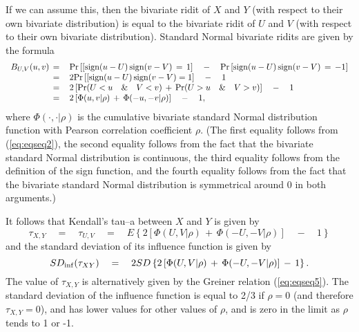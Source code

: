 \documentclass[a4paper]{article}      %
\begin{document}
If we can assume this, then the bivariate ridit of $X$ and $Y$ (with respect to their own bivariate distribution)
is equal to the bivariate ridit of $U$ and $V$ (with respect to their own bivariate distribution).
Standard Normal bivariate ridits are given by the formula
\begin{equation}
\begin{array}{rl}
B_{U,V}(u,v) \, = \,& {\rm Pr}\left[[{\rm sign}(u-U) \, {\rm sign}(v-V) \, = \, 1\right] \quad - \quad {\rm Pr}\left[{\rm sign}(u-U) \, {\rm sign}(v-V) \, = \, -1\right] \\
 = \,& 2{\rm Pr}\left[[{\rm sign}(u-U) \, {\rm sign}(v-V)=1\right] \quad - \quad 1 \\
 = \,& 2 \left[ {\rm Pr}(U<u \quad \& \quad V<v) \, + \, {\rm Pr}(U>u \quad \& \quad V>v)  \right] \quad - \quad 1 \\
 = \,& 2 \left[ \Phi(u,v | \rho) \, + \, \Phi(-u,-v | \rho) \right] \quad - \quad 1 ,
\end{array}
\label{eq:eqseq6}
\end{equation}
where $\Phi(\cdot,\cdot |\rho)$ is the cumulative bivariate standard Normal distribution function
with Pearson correlation coefficient $\rho$.
(The first equality follows from (\ref{eq:eqseq2}),
the second equality follows from the fact that the bivariate standard Normal distribution is continuous,
the third equality follows from the definition of the sign function,
and the fourth equality follows from the fact that the bivariate standard Normal distribution is symmetrical around 0
in both arguments.)

It follows that Kendall's tau--a between $X$ and $Y$ is given by
\begin{equation}
\tau_{X,Y} \quad = \quad \tau_{U,V} \quad = \quad E \left\{ 2 \left[ \Phi(U,V | \rho) \, + \, \Phi(-U,-V | \rho) \right] \quad - \quad 1 \right\}
\label{eq:eqseq7}
\end{equation}
and the standard deviation of its influence function is given by
\begin{equation}
SD_{\rm inf}(\tau_{XY}) \quad = \quad 2 SD\left\{ 2 \left[ \Phi(U,V | \rho) \, + \, \Phi(-U,-V | \rho) \right] \, - \, 1 \right\}.
\label{eq:eqseq8}
\end{equation}
The value of $\tau_{X,Y}$ is alternatively given by the Greiner relation (\ref{eq:eqseq5}). 
The standard deviation of the influence function is equal to 2/3 if $\rho=0$ (and therefore $\tau_{X,Y}=0$),
and has lower values for other values of $\rho$,
and is zero in the limit as $\rho$ tends to 1 or -1.
\end{document}
